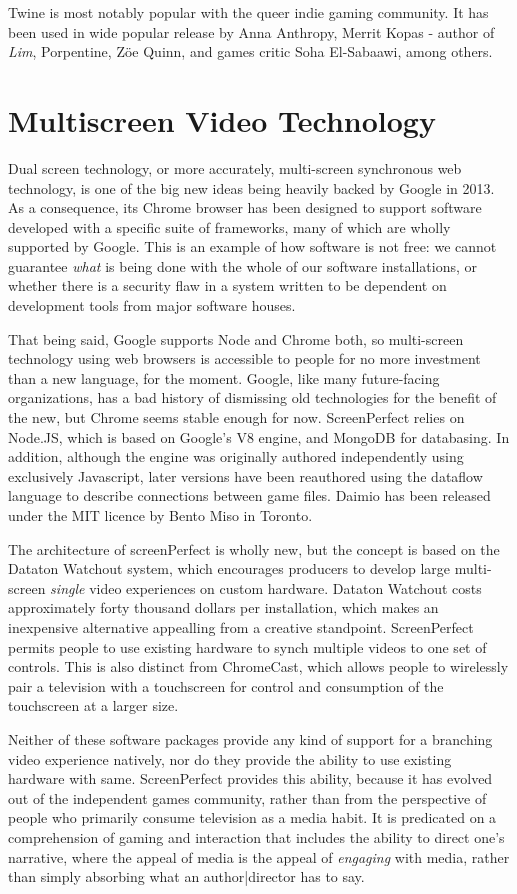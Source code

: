 Twine is most notably popular with the queer indie gaming community. It has been used in wide popular release by Anna Anthropy, Merrit Kopas - author of \textit{Lim}, Porpentine, Zöe Quinn, and games critic Soha El-Sabaawi, among others. 

\section{Multiscreen Video Technology}
Dual screen technology, or more accurately, multi-screen synchronous web technology, is one of the big new ideas being heavily backed by Google in 2013. As a consequence, its Chrome browser has been designed to support software developed with a specific suite of frameworks, many of which are wholly supported by Google. This is an example of how software is not free: we cannot guarantee \textit{what} is being done with the whole of our software installations, or whether there is a security flaw in a system written to be dependent on development tools from major software houses. 

That being said, Google supports Node and Chrome both, so multi-screen technology using web browsers is accessible to people for no more investment than a new language, for the moment. Google, like many future-facing organizations, has a bad history of dismissing old technologies for the benefit of the new, but Chrome seems stable enough for now. ScreenPerfect relies on Node.JS, which is based on Google's V8 engine, and MongoDB for databasing. In addition, although the engine was originally authored independently using exclusively Javascript, later versions have been reauthored using the \cite{daimio} dataflow language to describe connections between game files. Daimio has been released under the MIT licence by Bento Miso in Toronto.

The architecture of screenPerfect is wholly new, but the concept is based on the Dataton Watchout system, which encourages producers to develop large multi-screen \textit{single} video experiences on custom hardware. Dataton Watchout costs approximately forty thousand dollars per installation, which makes an inexpensive alternative appealling from a creative standpoint. ScreenPerfect permits people to use existing hardware to synch multiple videos to one set of controls. This is also distinct from ChromeCast, which allows people to wirelessly pair a television with a touchscreen for control and consumption of the touchscreen at a larger size. 

Neither of these software packages provide any kind of support for a branching video experience natively, nor do they provide the ability to use existing hardware with 
same. ScreenPerfect provides this ability, because it has evolved out of the independent games community, rather than from the perspective of people who primarily 
consume television as a media habit. It is predicated on a comprehension of gaming and interaction that includes the ability to direct one's narrative, where the appeal 
of media is the appeal of \textit{engaging} with media, rather than simply absorbing what an author|director has to say.

